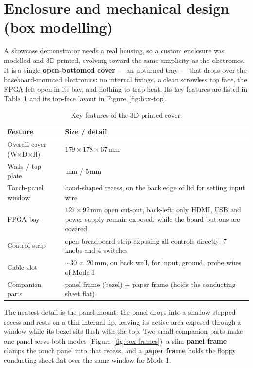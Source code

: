 \documentclass[11pt]{report}
\begin{document}
\section{Enclosure and mechanical design (box modelling)}

A showcase demonstrator needs a real housing, so a custom enclosure was modelled and 3D-printed, evolving toward the same simplicity as the electronics. It is a single \textbf{open-bottomed cover} --- an upturned tray --- that drops over the baseboard-mounted electronics: no internal fixings, a clean screwless top face, the FPGA left open in its bay, and nothing to trap heat. Its key features are listed in Table~\ref{tab:box} and its top-face layout in Figure~\ref{fig:box-top}.

\begin{table}[ht]
\centering
\renewcommand{\arraystretch}{1.25}
\begin{tabularx}{\textwidth}{@{}>{\raggedright\arraybackslash}p{3.6cm} >{\raggedright\arraybackslash}X@{}}
\toprule
\textbf{Feature} & \textbf{Size / detail} \\
\midrule
Overall cover (W$\times$D$\times$H) & $179 \times 178 \times 67$\,mm \\
Walls / top plate & 3\,mm / 5\,mm \\
Touch-panel window & hand-shaped recess, on the back edge of lid for setting input wire \\
FPGA bay & $127 \times 92$\,mm open cut-out, back-left; only HDMI, USB and power supply remain exposed, while the board buttons are covered \\
Control strip & open breadboard strip exposing all controls directly: 7 knobs and 4 switches \\
Cable slot & $\sim$30 $\times$ 20\,mm, on back wall, for input, ground, probe wires of Mode 1 \\
Companion parts & panel frame (bezel) + paper frame (holds the conducting sheet flat) \\
\bottomrule
\end{tabularx}
\caption{Key features of the 3D-printed cover.}
\label{tab:box}
\end{table}

The neatest detail is the panel mount: the panel drops into a shallow stepped recess and rests on a thin internal lip, leaving its active area exposed through a window while its bezel sits flush with the top. Two small companion parts make one panel serve both modes (Figure~\ref{fig:box-frames}): a slim \textbf{panel frame} clamps the touch panel into that recess, and a \textbf{paper frame} holds the floppy conducting sheet flat over the same window for Mode 1.
\end{document}
